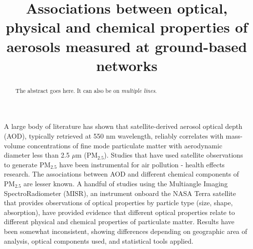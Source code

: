 \documentclass[, manuscript]{copernicus}
\begin{document}
\title{Associations between optical, physical and chemical properties of
aerosols measured at ground-based networks}














\received{}
\pubdiscuss{} %
\revised{}
\accepted{}
\published{}




\maketitle


\begin{abstract}
The abstract goes here. It can also be on \emph{multiple lines}.
\end{abstract}




\introduction

A large body of literature has shown that satellite-derived aerosol
optical depth (AOD), typically retrieved at 550 nm wavelength, reliably
correlates with mass-volume concentrations of fine mode particulate
matter with aerodynamic diameter less than 2.5 \(\mu\)m (PM\(_{2.5}\)).
Studies that have used satellite observations to generate PM\(_{2.5}\)
have been instrumental for air pollution - health effects research. The
associations between AOD and different chemical components of
PM\(_{2.5}\) are lesser known. A handful of studies using the Multiangle
Imaging SpectroRadiometer (MISR), an instrument onboard the NASA Terra
satellite that provides observations of optical properties by particle
type (size, shape, absorption), have provided evidence that different
optical properties relate to different physical and chemical properties
of particulate matter. Results have been somewhat inconsistent, showing
differences depending on geographic area of analysis, optical components
used, and statistical tools applied.
\end{document}
